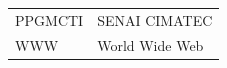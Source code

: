 \begin{thesisabbreviations}
\begin{normalsize}
\begin{longtable}[l]{p{2cm}l}
  PPGMCTI   \dotfill & SENAI CIMATEC \\
  WWW       \dotfill &  World Wide Web \\
\end{longtable}
\end{normalsize}
\end{thesisabbreviations}
